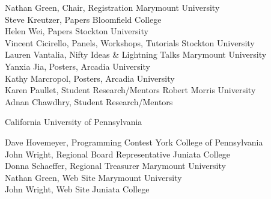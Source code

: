 \documentclass{article}
\begin{document}
{\parindent0pt
Nathan Green, Chair, Registration \dotfill Marymount University\\
Steve Kreutzer, Papers \dotfill Bloomfield College\\
Helen Wei, Papers \dotfill Stockton University\\
Vincent Cicirello, Panels, Workshops, Tutorials \dotfill Stockton University\\
Lauren Vantalia, Nifty Ideas \& Lightning Talks \dotfill Marymount University\\
Yanxia Jia, Posters, \dotfill Arcadia University\\
Kathy Marcropol, Posters, \dotfill Arcadia University\\
Karen Paullet, Student Research/Mentors \dotfill Robert Morris University\\
Adnan Chawdhry, Student Research/Mentors \dotfill

\dotfill California University of Pennsylvania

Dave Hovemeyer, Programming Contest \dotfill York College of Pennsylvania\\
John Wright, Regional Board Representative \dotfill Juniata College\\
Donna Schaeffer, Regional Treasurer \dotfill Marymount University\\
Nathan Green, Web Site \dotfill Marymount University\\
John Wright, Web Site \dotfill Juniata College\\
}
\end{document}
